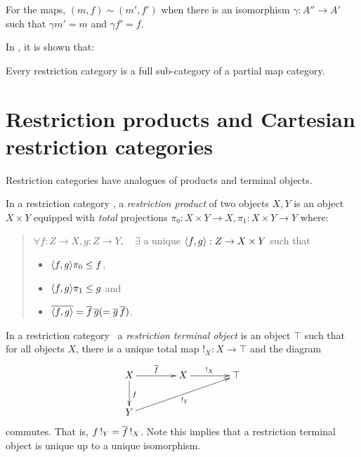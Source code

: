 For the maps, $(m,f) \sim (m',f')$ when there is an isomorphism $\gamma : A'' \to A'$
such that $\gamma m' = m$ and $\gamma f' = f$.

In \cite{cockettlack2003:restcategories2}, it is shown that:
\begin{theorem}
  Every restriction category is a full sub-category of a partial map category.
\end{theorem}
\section{Restriction products and Cartesian restriction categories} %
\label{sub:restriction_products_and_cartesian_restriction_categories}


Restriction categories have analogues of products and terminal objects.

\begin{definition}\label{def:restriction_product}
  In a restriction category \X, a \emph{restriction product}  of two objects $X, Y$ is an
  object $X\times Y$ equipped with \emph{total} projections
  $\pi_0:X\times Y\to X, \pi_1:X\times Y\to Y $ where:
  \begin{quote}
    $\forall f:Z\to X, g: Z\to Y, \quad \exists$ a unique $\langle f,g\rangle:Z \to X\times Y$ such that
    \begin{itemize}
      \item $\langle f,g\rangle \pi_0 \le f$,
      \item $\langle f,g\rangle \pi_1 \le g$ and
      \item $\overline{\langle f,g\rangle} = \overline{f}\, \overline{g} ( = \overline{g}\, \overline{f})$.
    \end{itemize}
  \end{quote}
\end{definition}

\begin{definition}\label{def:restriction_terminal_object}
  In a restriction category \X\, a \emph{restriction terminal object}
  is an object $\top$ such that for all objects $X$, there is a
  unique total map $!_X : X \to \top$ and the diagram
  \[
    \xymatrix @C=40pt @R=25pt{
      X \ar[r]^{\restr{f}} \ar[d]^{f} & X \ar[r]^{!_X}  &\top  \\
      Y \ar[urr]_{!_Y}
    }
  \]
  commutes. That is,  $f\, !_Y = \overline{f}\, !_X$. Note this implies
  that a restriction terminal object is unique up to a unique isomorphism.
\end{definition}

